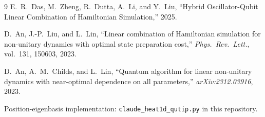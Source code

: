 \documentclass[11pt]{article}
\begin{document}
\begin{thebibliography}{9}
E.~R.~Das, M.~Zheng, R.~Dutta, A.~Li, and Y.~Liu,
``Hybrid Oscillator-Qubit Linear Combination of Hamiltonian Simulation,''
2025.

D.~An, J.-P.~Liu, and L.~Lin,
``Linear combination of Hamiltonian simulation for non-unitary dynamics
with optimal state preparation cost,''
\textit{Phys.\ Rev.\ Lett.}, vol.~131, 150603, 2023.

D.~An, A.~M.~Childs, and L.~Lin,
``Quantum algorithm for linear non-unitary dynamics with near-optimal
dependence on all parameters,''
\textit{arXiv:2312.03916}, 2023.

Position-eigenbasis implementation:
\texttt{claude\_heat1d\_qutip.py} in this repository.
\end{thebibliography}
\end{document}
